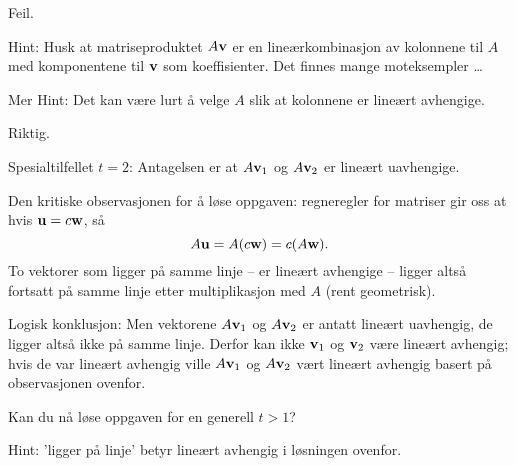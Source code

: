 \begin{losning}

\begin{punkt}
Feil.

\noindent
Hint: Husk at matriseproduktet $A\mathbf{v}$ er en lineærkombinasjon av kolonnene til $A$ med komponentene til $\mathbf{v}$ som koeffisienter. Det finnes mange moteksempler \ldots 

Mer Hint: Det kan være lurt å velge $A$ slik at kolonnene er lineært avhengige.
\end{punkt}


\begin{punkt}
Riktig.

\noindent
Spesialtilfellet $t=2$: Antagelsen er at $A\mathbf{v}_1$ og $A\mathbf{v}_2$ er lineært uavhengige. 

Den kritiske observasjonen for å løse oppgaven: regneregler for matriser gir oss at hvis $\mathbf{u}=c\mathbf{w}$, så $$A\mathbf{u}=A(c\mathbf{w})=c(A\mathbf{w}).$$ To vektorer som ligger på samme linje -- er lineært avhengige -- ligger altså fortsatt på samme linje etter multiplikasjon med $A$ (rent geometrisk).

Logisk konklusjon: Men vektorene $A\mathbf{v}_1$ og $A\mathbf{v}_2$ er antatt lineært uavhengig, de ligger altså ikke på samme linje. Derfor kan ikke $\mathbf{v}_1$ og $\mathbf{v}_2$ være lineært avhengig; hvis de var lineært avhengig ville $A\mathbf{v}_1$ og $A\mathbf{v}_2$ vært lineært avhengig basert på observasjonen ovenfor.

Kan du nå løse oppgaven for en generell $t>1$? 

\noindent
Hint: 'ligger på linje' betyr lineært avhengig i løsningen ovenfor.

\end{punkt}



\end{losning}








